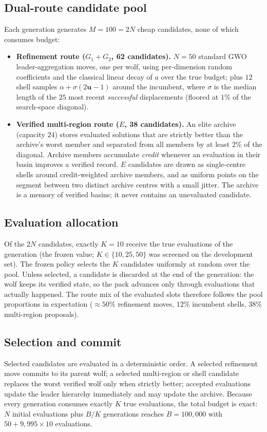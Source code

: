 \documentclass[journal]{IEEEtran}
\begin{document}
\subsection{Dual-route candidate pool}
Each generation generates $M=100=2N$ cheap candidates, none of which consumes
budget:
\begin{itemize}
\item \textbf{Refinement route ($G_1+G_2$, 62 candidates).} $N=50$
standard GWO leader-aggregation moves, one per wolf, using per-dimension
random coefficients and the classical linear decay of $a$ over the true
budget; plus $12$ shell samples $\alpha+\sigma(2\mathbf{u}-1)$ around the
incumbent, where $\sigma$ is the median length of the $25$ most recent
\emph{successful} displacements (floored at $1\%$ of the search-space
diagonal).
\item \textbf{Verified multi-region route ($E$, 38 candidates).} An elite
archive (capacity $24$) stores evaluated solutions that are strictly better
than the archive's worst member and separated from all members by at least
$2\%$ of the diagonal. Archive members accumulate \emph{credit} whenever an
evaluation in their basin improves a verified record. $E$ candidates are
drawn as single-centre shells around credit-weighted archive members, and as
uniform points on the segment between two distinct archive centres with a
small jitter. The archive is a memory of verified basins; it never contains
an unevaluated candidate.
\end{itemize}

\subsection{Evaluation allocation}
Of the $2N$ candidates, exactly $K=10$ receive the true evaluations of the
generation (the frozen value; $K\in\{10,25,50\}$ was screened on the
development set). The frozen policy selects the $K$ candidates uniformly at
random over the pool. Unless selected, a candidate is discarded at the end of
the generation: the wolf keeps its verified state, so the pack advances only
through evaluations that actually happened. The route mix of the evaluated
slots therefore follows the pool proportions in expectation
($\approx$$50\%$ refinement moves, $12\%$ incumbent shells, $38\%$
multi-region proposals).

\subsection{Selection and commit}
Selected candidates are evaluated in a deterministic order. A selected
refinement move commits to its parent wolf; a selected multi-region or shell
candidate replaces the worst verified wolf only when strictly better;
accepted evaluations update the leader hierarchy immediately and may update
the archive. Because every generation consumes exactly $K$ true evaluations,
the total budget is exact: $N$ initial evaluations plus $B/K$ generations
reaches $B=100{,}000$ with $50+9{,}995\times 10$ evaluations.
\end{document}
